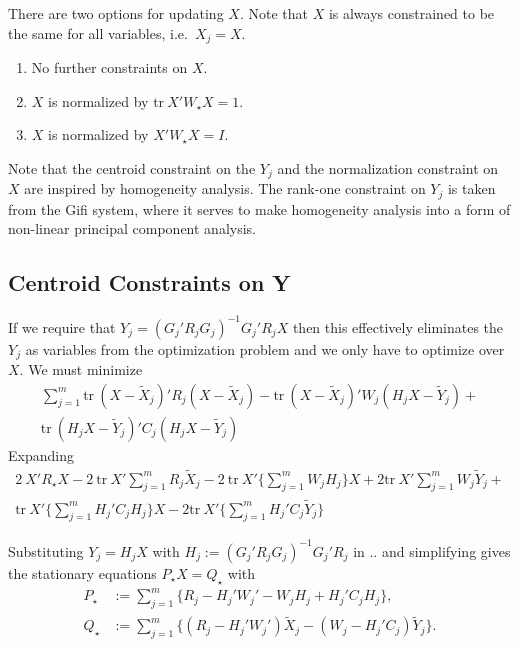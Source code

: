 \documentclass[
  12pt,
]{article}
\providecommand{\tightlist}{%
  \setlength{\itemsep}{0pt}\setlength{\parskip}{0pt}}
\begin{document}
There are two options for updating \(X\). Note that \(X\) is always
constrained to be the same for all variables, i.e.~\(X_j=X\).

\begin{enumerate}
\def\labelenumi{\arabic{enumi}.}
\setcounter{enumi}{-1}
\tightlist
\item
  No further constraints on \(X\).
\item
  \(X\) is normalized by \(\text{tr}\ X'W_\star X=1\).
\item
  \(X\) is normalized by \(X'W_\star X=I\).
\end{enumerate}

Note that the centroid constraint on the \(Y_j\) and the normalization
constraint on \(X\) are inspired by homogeneity analysis. The rank-one
constraint on \(Y_j\) is taken from the Gifi system, where it serves
to make homogeneity analysis into a form of non-linear principal
component analysis.

\subsection{Centroid Constraints on Y}\label{centroid-constraints-on-y}

If we require that \(Y_j=(G_j'R_jG_j)^{-1}G_j'R_jX\) then this effectively eliminates the \(Y_j\) as variables from the optimization problem and we only have to optimize over \(X\). We must minimize
\begin{multline}
\sum_{j=1}^m\text{tr}\ (X-\tilde X_j)'R_j(X-\tilde X_j) -
\text{tr}\ (X-\tilde X_j)'W_j(H_jX-\tilde Y_j)+\\
\text{tr}\ (H_jX-\tilde Y_j)'C_j(H_jX-\tilde Y_j)
\end{multline}
Expanding
\begin{multline}
2\ X'R_\star X-2\ \text{tr}\ X'\sum_{j=1}^mR_j\tilde X_j-2\ \text{tr}\ X'\{\sum_{j=1}^mW_jH_j\}X + 2\text{tr}\ X'\sum_{j=1}^mW_j\tilde Y_j+\\
\text{tr}\ X'\{\sum_{j=1}^mH_j'C_jH_j\}X-2\text{tr}\ X'\{\sum_{j=1}^mH_j'C_j\tilde Y_j\}
\end{multline}

Substituting \(Y_j=H_jX\) with \(H_j:=(G_j'R_jG_j)^{-1}G_j'R_j\) in .. and simplifying gives
the stationary equations \(P_\star X= Q_\star\) with
\begin{subequations}
\begin{align}
P_\star&:=\sum_{j=1}^m\{R_j-H_j'W_j'-W_jH_j+H_j'C_jH_j\},\\
Q_\star&:=\sum_{j=1}^m\{(R_j-H_j'W_j')\tilde X_j-(W_j-H_j'C_j)\tilde Y_j\}.
\end{align}
\end{subequations}
\end{document}
